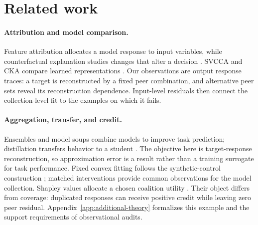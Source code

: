 \section{Related work}
\label{sec:related}

\paragraph{Attribution and model comparison.}
Feature attribution allocates a model response to input variables, while counterfactual explanation studies changes that alter a decision \citep{ribeiro2016lime,sundararajan2017integrated,wachter2017counterfactual}. SVCCA and CKA compare learned representations \citep{raghu2017svcca,kornblith2019cka}. Our observations are output response traces: a target is reconstructed by a fixed peer combination, and alternative peer sets reveal its reconstruction dependence. Input-level residuals then connect the collection-level fit to the examples on which it fails.

\paragraph{Aggregation, transfer, and credit.}
Ensembles and model soups combine models to improve task prediction; distillation transfers behavior to a student \citep{hinton2015distilling,wortsman2022model}. The objective here is target-response reconstruction, so approximation error is a result rather than a training surrogate for task performance. Fixed convex fitting follows the synthetic-control construction \citep{abadie2010synthetic}; matched interventions provide common observations for the model collection. Shapley values allocate a chosen coalition utility \citep{shapley1953value,lundberg2017shap}. Their object differs from coverage: duplicated responses can receive positive credit while leaving zero peer residual. Appendix~\ref{app:additional-theory} formalizes this example and the support requirements of observational audits.
